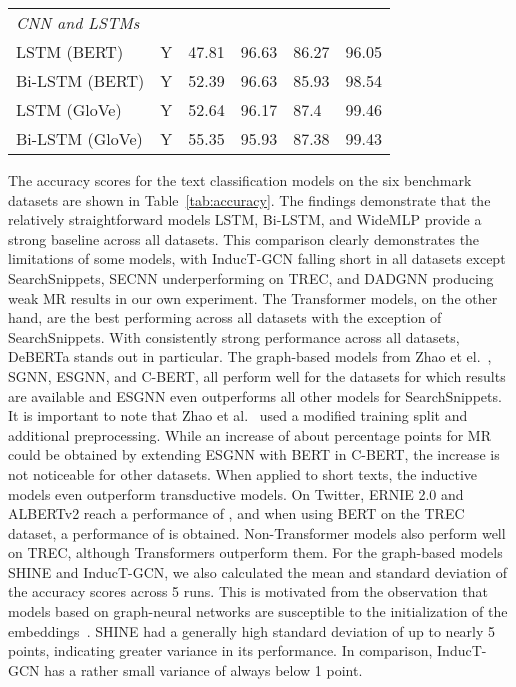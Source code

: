 \documentclass[runningheads]{llncs}
\begin{document}
\begin{table*}[!ht]
\begin{tabular}{lcllll}
        \midrule
        \textit{CNN and LSTMs} \\
        LSTM (BERT)               & Y                   & 47.81            & 96.63           & 86.27             & 96.05            \\
        Bi-LSTM (BERT)            & Y                   & 52.39            & 96.63           & 85.93             & 98.54            \\
        LSTM (GloVe)              & Y                   & 52.64            & 96.17           & 87.4              & 99.46            \\
        Bi-LSTM (GloVe)           & Y                   & 55.35            & 95.93           & 87.38             & 99.43            \\
        \bottomrule
    \end{tabular}
\end{table*}

The accuracy scores for the text classification models on the six benchmark datasets are shown in Table~\ref{tab:accuracy}. The findings demonstrate that the relatively straightforward models LSTM, Bi-LSTM, and WideMLP provide a strong baseline across all datasets. 
This comparison clearly demonstrates the limitations of some models, with InducT-GCN falling short in all datasets except SearchSnippets, SECNN underperforming on TREC, and DADGNN producing weak MR results in our own experiment. 
The Transformer models, on the other hand, are the best performing across all datasets with the exception of SearchSnippets. With consistently strong performance across all datasets, DeBERTa stands out in particular.
The graph-based models from Zhao et el.~\cite{zhao2021sequential}, SGNN, ESGNN, and C-BERT, all perform well for the datasets for which results are available and ESGNN even outperforms all other models for SearchSnippets. 
It is important to note that Zhao et al.~\cite{zhao2021sequential} used a modified training split and additional preprocessing. 
While an increase of about  percentage points for MR could be obtained by extending ESGNN with BERT in C-BERT, the increase is not noticeable for other datasets.
When applied to short texts, the inductive models even outperform transductive models. 
On Twitter, ERNIE 2.0 and ALBERTv2 reach a performance of , and when using BERT on the TREC dataset, a performance of  is obtained.
Non-Transformer models also perform well on TREC, although Transformers outperform them. 
For the graph-based models SHINE and InducT-GCN, we also calculated the mean and standard deviation of the accuracy scores across 5 runs. 
This is motivated from the observation that models based on graph-neural networks are susceptible to the initialization of the embeddings~\cite{pitfallsShchur2018}.
SHINE had a generally high standard deviation of up to nearly 5 points, indicating greater variance in its performance.
In comparison, InducT-GCN has a rather small variance of always below 1 point. 
\end{document}
